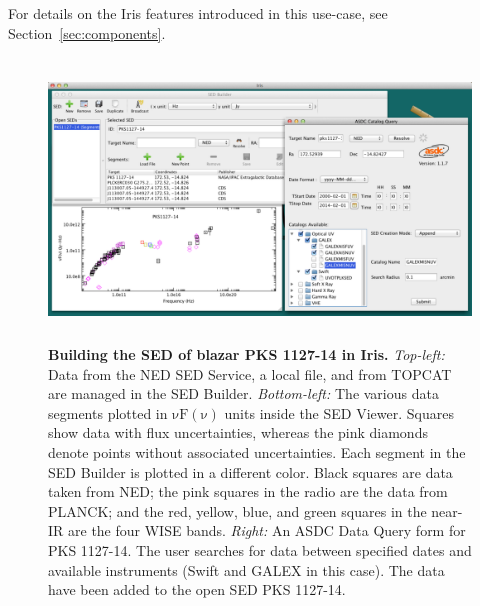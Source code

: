 \documentclass[preprint,authoryear,5p]{elsarticle}
\begin{document}
For details on the Iris features introduced in this use-case, see Section~\ref{sec:components}.

\begin{figure} \centering
\includegraphics[height=2.95in,width=5.3in]{built-in-visuals-loading.pdf}
\caption{\textbf{Building the SED of blazar PKS 1127-14 in Iris.}  
\textit{Top-left:} Data from the NED SED Service, a local file, and from TOPCAT
are managed in the SED Builder. \textit{Bottom-left:} The various data segments
plotted in $\mathrm{\nu F \left( \nu \right)}$ units inside the SED Viewer.
Squares show data with flux uncertainties, whereas the pink diamonds denote
points without associated uncertainties. Each segment in the SED Builder is
plotted in a different color. Black squares are data taken from NED; the
pink squares in the radio are the data from PLANCK; and the red, yellow, blue,
and green squares in the near-IR are the four WISE bands. \textit{Right:} An ASDC
Data Query form for PKS 1127-14. The user searches for data between specified
dates and available instruments (Swift and GALEX in this case). The data have
been added to the open SED PKS 1127-14.} \label{fig:load_data}
\end{figure}
\end{document}
